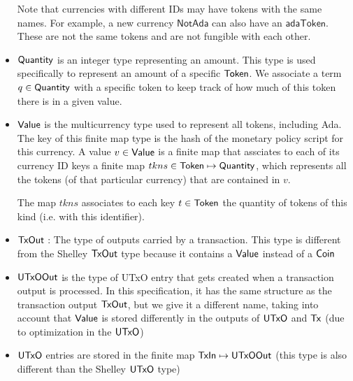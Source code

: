 \begin{itemize}
  Note that currencies with different IDs may have tokens with the same names.
  For example, a new currency $\mathsf{NotAda}$ can also have an $\mathsf{adaToken}$.
  These are not the same tokens and are not fungible with each other.

  \item $\mathsf{Quantity}$ is an integer type representing an amount. This type is used
  specifically to represent an amount of a specific $\mathsf{Token}$. We associate
  a term $q\in\mathsf{Quantity}$ with a specific token to keep track of how much of
  this token there is in a given value.

  \item $\mathsf{Value}$ is the multicurrency type used to represent
  all tokens, including Ada. The key of this finite map type is
  the hash of the monetary policy script for this currency.
  A value $v\in\mathsf{Value}$ is a finite map that assciates to each of its
  currency ID keys a finite map $tkns\in\mathsf{Token} \mapsto \mathsf{Quantity}$,
  which represents all the tokens (of that particular
  currency) that are contained in $v$.

  The map $tkns$ associates to each key $t\in\mathsf{Token}$ the quantity of tokens of
  this kind (i.e. with this identifier).

  \item $\mathsf{TxOut}$ : The type of outputs carried by a transaction. This type
  is different from the Shelley $\mathsf{TxOut}$ type because it contains a $\mathsf{Value}$
  instead of a $\mathsf{Coin}$

  \item $\mathsf{UTxOOut}$ is the type of UTxO entry that gets created when a transaction
  output is processed. In this specification, it has the same structure as
  the transaction output $\mathsf{TxOut}$, but we give it a different name, taking into
  account that $\mathsf{Value}$ is stored differently in the outputs of $\mathsf{UTxO}$ and $\mathsf{Tx}$
  (due to optimization in the $\mathsf{UTxO}$)

  \item $\mathsf{UTxO}$ entries are stored in the finite map $\mathsf{TxIn}\mapsto \mathsf{UTxOOut}$
  (this type is also different than the Shelley $\mathsf{UTxO}$ type)

\end{itemize}


